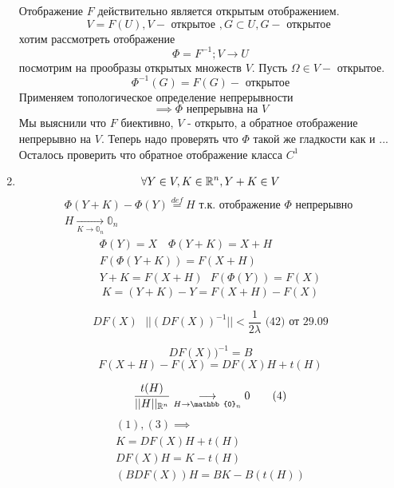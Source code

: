 \documentclass[main]{subfiles}
\begin{document}
\begin{longProof}
\begin{enumerate}
                 Отображение $F$ действительно является открытым отображением.
                 \[ V =F(U), V - \text{ открытое } , G \subset U, G - \text{ открытое }\]
                 хотим рассмотреть отображение
                 \[ \Phi = F^{-1}; V \rightarrow U \]
                 посмотрим на прообразы открытых множеств $V$.
                 Пусть $\Omega \in V - $ открытое.
                 \[ \Phi^{-1}(G) = F(G) - \text{ открытое}\]
                 Применяем топологическое определение непрерывности
                 \[ \implies \Phi \text{ непрерывна на } V \]
                 Мы выяснили что $F$ биективно, $V$ - открыто, а обратное отображение непрерывно
                   на $V$. Теперь надо проверять что $\Phi$ такой же гладкости как и ...
                   Осталось проверить что обратное отображение класса $C^1$
                  \item \[\forall Y \in V , K \in {\mathbb{R}}^n , Y + K \in V\] 
                  \begin{gather*}
                  \Phi(Y+K) - \Phi(Y) \stackrel{def}{=} H \text { т.к. отображение } \Phi
                 \text { непрерывно }\\
                  H \underset{K \to \mathbb{0}_n}{\longrightarrow} \mathbb{0}_n 
                  \end{gather*}
                 \begin{gather*}
                     \Phi(Y) = X \quad \Phi(Y+K) = X + H \\
                      F(\Phi(Y+K)) = F(X+H) \\
                     Y + K = F(X+H) \text{  } F(\Phi(Y)) = F(X) 
                 \end{gather*}
                 \[   K = (Y+K) - Y = F(X+H) - F(X) \tag{1} \]
 
                 \[DF(X) \text {   } ||(DF(X))^{-1}|| < \frac{1}{2\lambda} \text{ (42) от 29.09} \tag{2} \]
 
                 \[DF(X))^{-1} = B \]
                 \[F(X+H) - F(X) = DF(X)H+ t(H) \tag{3}\]
 
                 \[ \frac{t(H)}{||H||_{{\vR}^n}} \underset{H \to \mathbb{0}_n}{\longrightarrow} 0 \tag{4} \]
                  \begin{gather*}
                     (1),(3) \implies \\
                     K = DF(X)H + t(H) \\
                     DF(X)H = K - t(H) \\
                     (BDF(X))H = BK - B(t(H))
                  \end{gather*}
 

\end{enumerate}
\end{longProof}
\end{document}
